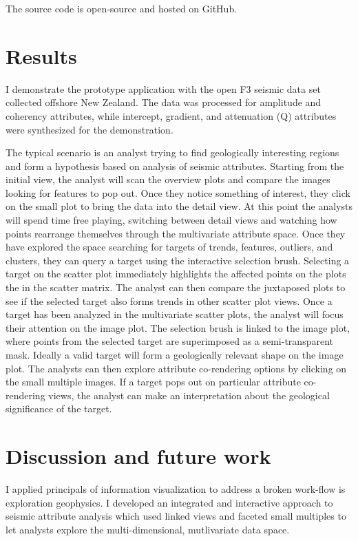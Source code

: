 \documentclass[journal]{vgtc}                %
\begin{document}
The source code is open-source and hosted on GitHub.

\section{Results}
I demonstrate the prototype application with the open F3 seismic data set collected offshore New
Zealand. The data was processed for amplitude and coherency attributes, while intercept,
gradient, and attenuation (Q) attributes were synthesized for the demonstration.

The typical scenario is an analyst trying to find geologically interesting regions and form
a hypothesis based on analysis of seismic attributes. Starting from
the initial view, the analyst will scan the overview plots and compare the images looking
for features to pop out. Once they notice something of interest, they click on the
small plot to bring the data into the detail view. At this point the analysts will spend
time free playing, switching between detail views and watching how points rearrange
themselves through the multivariate attribute space. Once they have explored the space
searching for targets of trends, features, outliers, and clusters, they can query a target
using the interactive selection brush. Selecting a target on the scatter plot immediately highlights
the affected points on the plots the in the scatter matrix. The analyst can then compare
the juxtaposed plots to see if the selected target also forms trends in other scatter plot
views. Once a target has been analyzed in the multivariate scatter plots, the analyst
will focus their attention on the image plot. The selection brush is linked to the
image plot, where points from the selected target are superimposed as a semi-transparent
mask. Ideally a valid target will form a geologically relevant shape on the image plot.
The analysts can then explore attribute co-rendering options by clicking on the small multiple
images. If a target pops out on particular attribute co-rendering views, the analyst
can make an interpretation about the geological significance of the target.


\section{Discussion and future work}
I applied principals of information visualization to address a broken
work-flow is exploration geophysics. I developed an integrated and interactive
approach to seismic attribute analysis which used linked views and faceted small
multiples to let analysts explore the multi-dimensional, mutlivariate data space.
\end{document}
